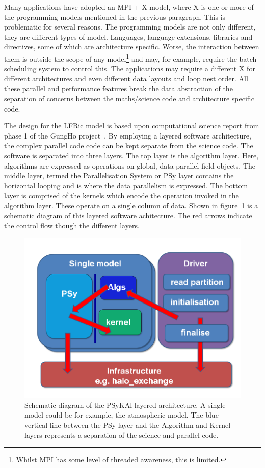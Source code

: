 \documentclass[times]{elsarticle}
\begin{document}
Many applications have adopted an MPI + X model, where X is one or
more of the programming models mentioned in the previous paragraph. This
is problematic for several reasons. The programming models are not
only different, they are different types of model. Languages, language
extensions, libraries and directives, some of which are architecture
specific. Worse, the interaction between them is outside the scope of
any model\footnote{Whilst MPI has some level of threaded awareness,
  this is limited.} and may, for example, require the batch scheduling
system to control this. The applications may require a different X for
different architectures and even different data layouts and
loop nest order. All these parallel and performance features
break the data abstraction of the separation of concerns between the
maths/science code and architecture specific code.

The design for the LFRic model is based upon computational science
report from phase 1 of the GungHo project~\cite{GHP1_CSR}. By
employing a layered software architecture, the complex parallel code
code can be kept separate from the science code. The software is
separated into three layers. The top layer is the algorithm
layer. Here, algorithms are expressed as operations on global,
data-parallel field objects. The middle layer, termed the
Parallelisation System or PSy layer contains the horizontal looping
and is where the data parallelism is expressed.  The bottom layer is
comprised of the kernels which encode the operation invoked in the
algorithm layer. These operate on a single column of data. 
Shown in figure~\ref{fig:psykal} is a schematic diagram of this
layered software achitecture. The red arrows indicate the control flow
though the different layers. 

\begin{figure}
\centering\includegraphics[width=0.8\linewidth]{PSyKAl.pdf}
\caption{\label{fig:psykal} Schematic diagram of the PSyKAl layered
  architecture. A single model could be for example, the atmospheric
  model. The blue vertical line between the PSy layer and the
  Algorithm and Kernel layers represents a separation of the science
  and parallel code.}
\end{figure}
\end{document}
